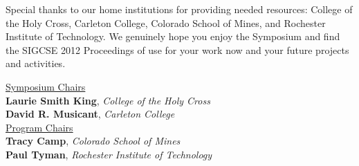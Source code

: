 Special thanks to our home institutions for providing needed resources: College of the Holy Cross, Carleton College, Colorado School of Mines, and Rochester Institute of Technology. We genuinely hope you enjoy the Symposium and find the SIGCSE 2012 Proceedings of use for your work now and your future projects and activities.

\raggedleft
\underline{Symposium Chairs} \\
\vspace{0.5\baselineskip}
\textbf{Laurie Smith King}, \textit{College of the Holy Cross} \\
\textbf{David R. Musicant}, \textit{Carleton College} \\
\vspace{1em}
\underline{Program Chairs} \\
\vspace{0.5\baselineskip}
\textbf{Tracy Camp}, \textit{Colorado School of Mines} \\
\textbf{Paul Tyman}, \textit{Rochester Institute of Technology} 
\newpage
